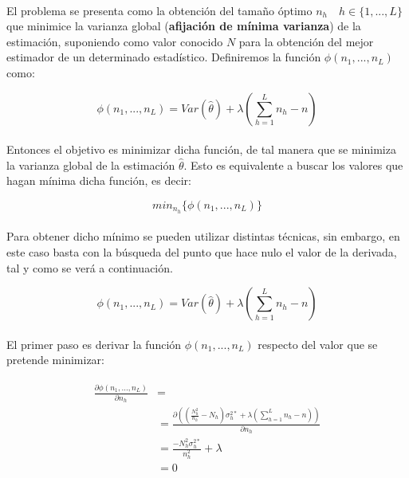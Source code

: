 \documentclass{article}
\begin{document}
      \paragraph{}
      El problema se presenta como la obtención del tamaño óptimo $n_h \quad h \in \{1,..., L\}$ que minimice la varianza global (\textbf{afijación de mínima varianza}) de la estimación, suponiendo como valor conocido $N$ para la obtención del mejor estimador de un determinado estadístico. Definiremos la función $\phi(n_1, ..., n_L)$ como:

      \begin{equation}
        \phi(n_1, ..., n_L) = Var(\widehat{\theta}) + \lambda \left( \sum\limits_{h=1}^L n_h - n\right)
      \end{equation}

      \paragraph{}

      Entonces el objetivo es minimizar dicha función, de tal manera que se minimiza la varianza global de la estimación $\widehat{\theta}$. Esto es equivalente a buscar los valores que hagan mínima dicha función, es decir:

      \begin{equation}
        min_{n_h}\{\phi(n_1, ..., n_L)\}
      \end{equation}

      \paragraph{}
      Para obtener dicho mínimo se pueden utilizar distintas técnicas, sin embargo, en este caso basta con la búsqueda del punto que hace nulo el valor de la derivada, tal y como se verá a continuación.

      \begin{equation}
        \phi(n_1, ..., n_L) = Var(\widehat{\theta}) + \lambda \left( \sum\limits_{h=1}^L n_h - n\right)
      \end{equation}


      \paragraph{}
      El primer paso es derivar la función $\phi(n_1, ..., n_L)$ respecto del valor que se pretende minimizar:

      \begin{align}
      \label{eq:derivate_1}
        \begin{split}
          \frac{\partial \phi(n_1, ..., n_L)}{\partial n_h} &= \\
          &= \frac{\partial\left( \left(\frac{N_h^2}{n_h}- N_h\right)\sigma_h^{2*}
          + \lambda \left( \sum\limits_{h=1}^L n_h - n\right)\right) }{\partial n_h} \\
          &= \frac{-N_h^2 \sigma_h^{2*}}{n_h^2} +\lambda \\
          &= 0
        \end{split}
      \end{align}
\end{document}
